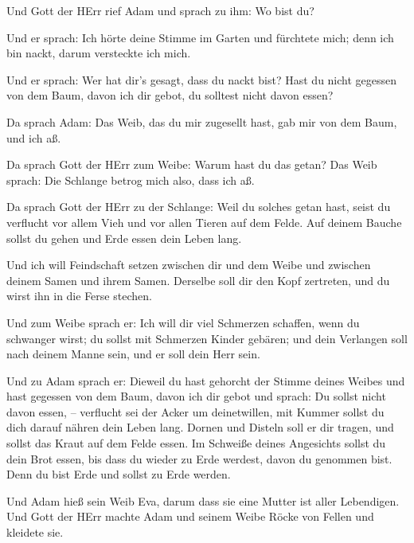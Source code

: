 Und Gott der HErr rief Adam und sprach zu ihm: Wo bist du?

 Und er sprach: Ich hörte deine Stimme im Garten und
fürchtete mich; denn ich bin nackt, darum versteckte ich mich.

 Und er sprach: Wer hat dir's gesagt, dass du nackt bist?
Hast du nicht gegessen von dem Baum, davon ich dir gebot, du solltest
nicht davon essen?

 Da sprach Adam: Das Weib, das du mir zugesellt hast, gab
mir von dem Baum, und ich aß.

 Da sprach Gott der HErr zum Weibe: Warum hast du das
getan? Das Weib sprach: Die Schlange betrog mich also, dass ich aß.

 Da sprach Gott der HErr zu der Schlange: Weil du solches
getan hast, seist du verflucht vor allem Vieh und vor allen Tieren auf
dem Felde. Auf deinem Bauche sollst du gehen und Erde essen dein Leben
lang.

 Und ich will Feindschaft setzen zwischen dir und dem Weibe
und zwischen deinem Samen und ihrem Samen. Derselbe soll dir den Kopf
zertreten, und du wirst ihn in die Ferse stechen.

 Und zum Weibe sprach er: Ich will dir viel Schmerzen
schaffen, wenn du schwanger wirst; du sollst mit Schmerzen Kinder
gebären; und dein Verlangen soll nach deinem Manne sein, und er soll
dein Herr sein.

 Und zu Adam sprach er: Dieweil du hast gehorcht der Stimme
deines Weibes und hast gegessen von dem Baum, davon ich dir gebot und
sprach: Du sollst nicht davon essen, -- verflucht sei der Acker um
deinetwillen, mit Kummer sollst du dich darauf nähren dein Leben lang.
 Dornen und Disteln soll er dir tragen, und sollst das
Kraut auf dem Felde essen.  Im Schweiße deines Angesichts
sollst du dein Brot essen, bis dass du wieder zu Erde werdest, davon du
genommen bist. Denn du bist Erde und sollst zu Erde werden.

 Und Adam hieß sein Weib Eva, darum dass sie eine Mutter
ist aller Lebendigen.  Und Gott der HErr machte Adam und
seinem Weibe Röcke von Fellen und kleidete sie.

